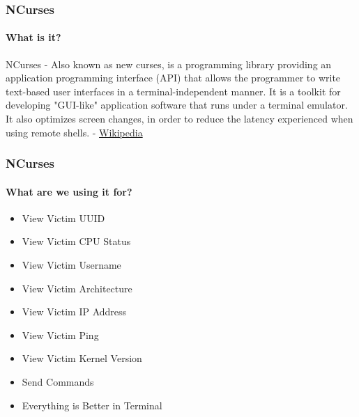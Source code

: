 \documentclass[aspectratio=169]{beamer}
\begin{document}
\begin{frame}
  \frametitle{NCurses}
  \framesubtitle{What is it?}
  \begin{tcolorbox}[title=\href{https://en.wikipedia.org/wiki/Ncurses}{ncurses.log},colback=gray]
    NCurses - Also known as new curses, is a programming library providing an application programming interface (API) that allows the programmer to write text-based user interfaces in a terminal-independent manner. It is a toolkit for developing "GUI-like" application software that runs under a terminal emulator. It also optimizes screen changes, in order to reduce the latency experienced when using remote shells. - \href{https://en.wikipedia.org/wiki/Ncurses}{Wikipedia}
  \end{tcolorbox}
\end{frame}

\begin{frame}
  \frametitle{NCurses}
  \framesubtitle{What are we using it for?}
  \begin{itemize}
  \item{View Victim UUID}
  \item{View Victim CPU Status}
  \item{View Victim Username}
  \item{View Victim Architecture}
  \item{View Victim IP Address}
  \item{View Victim Ping}
  \item{View Victim Kernel Version}
  \item{Send Commands}
  \item{Everything is Better in Terminal}
  \end{itemize}
\end{frame}
\end{document}
